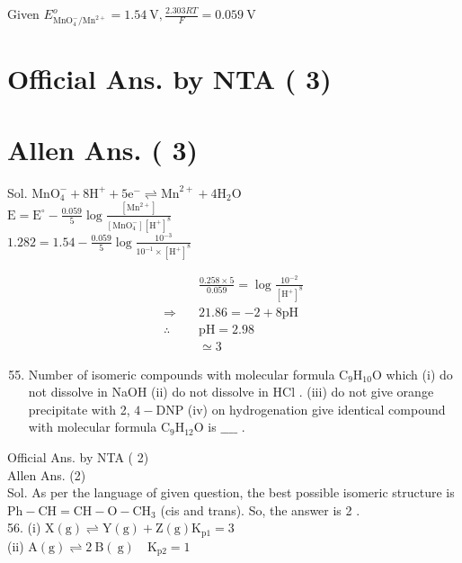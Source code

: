 \documentclass[10pt]{article}
\begin{document}
Given \(E_{\mathrm{MnO}_{4}^{-} / \mathrm{Mn}^{2+}}^{o}=1.54 \mathrm{~V}, \frac{2.303 R T}{F}=0.059 \mathrm{~V}\)

\section*{Official Ans. by NTA ( 3)}
\section*{Allen Ans. ( 3)}
Sol. \(\mathrm{MnO}_{4}^{-}+8 \mathrm{H}^{+}+5 \mathrm{e}^{-} \rightleftharpoons \mathrm{Mn}^{2+}+4 \mathrm{H}_{2} \mathrm{O}\)\\
\(\mathrm{E}=\mathrm{E}^{\circ}-\frac{0.059}{5} \log \frac{\left[\mathrm{Mn}^{2+}\right]}{\left[\mathrm{MnO}_{4}^{-}\right]\left[\mathrm{H}^{+}\right]^{8}}\)\\
\(1.282=1.54-\frac{0.059}{5} \log \frac{10^{-3}}{10^{-1} \times\left[\mathrm{H}^{+}\right]^{8}}\)

\[
\begin{array}{ll} 
& \frac{0.258 \times 5}{0.059}=\log \frac{10^{-2}}{\left[\mathrm{H}^{+}\right]^{8}} \\
\Rightarrow \quad & 21.86=-2+8 \mathrm{pH} \\
\therefore \quad & \mathrm{pH}=2.98 \\
& \simeq 3
\end{array}
\]

\begin{enumerate}
  \setcounter{enumi}{54}
  \item Number of isomeric compounds with molecular formula \(\mathrm{C}_{9} \mathrm{H}_{10} \mathrm{O}\) which (i) do not dissolve in NaOH (ii) do not dissolve in HCl . (iii) do not give orange precipitate with 2, \(4-\mathrm{DNP}\) (iv) on hydrogenation give identical compound with molecular formula \(\mathrm{C}_{9} \mathrm{H}_{12} \mathrm{O}\) is \(\_\_\_\_\) .
\end{enumerate}

Official Ans. by NTA ( 2)\\
Allen Ans. (2)\\
Sol. As per the language of given question, the best possible isomeric structure is \(\mathrm{Ph}-\mathrm{CH}=\mathrm{CH}-\mathrm{O}-\mathrm{CH}_{3}\) (cis and trans). So, the answer is 2 .\\
56. (i) \(\mathrm{X}(\mathrm{g}) \rightleftharpoons \mathrm{Y}(\mathrm{g})+\mathrm{Z}(\mathrm{g}) \mathrm{K}_{\mathrm{p} 1}=3\)\\
(ii) \(\mathrm{A}(\mathrm{g}) \rightleftharpoons 2 \mathrm{~B}(\mathrm{~g}) \quad \mathrm{K}_{\mathrm{p} 2}=1\)
\end{document}
